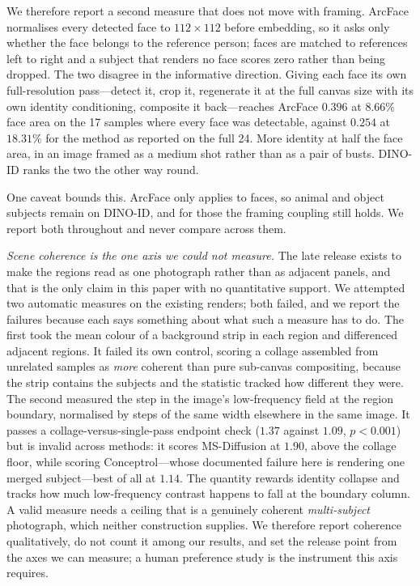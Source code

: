 \documentclass[10pt,twocolumn,letterpaper]{article}
\begin{document}
We therefore report a second measure that does not move with framing.
ArcFace normalises every detected face to $112\times112$ before embedding, so
it asks only whether the face belongs to the reference person; faces are
matched to references left to right and a subject that renders no face scores
zero rather than being dropped.  The two disagree in the informative
direction.  Giving each face its
own full-resolution pass---detect it, crop it, regenerate it at the full canvas
size with its own identity conditioning, composite it back---reaches ArcFace
$0.396$ at $8.66\%$ face area on the 17 samples where every face was
detectable, against $0.254$ at $18.31\%$ for the method as reported on the
full 24.  More identity at half the face area, in an image framed as a medium
shot rather than as a pair of busts.  DINO-ID ranks the two the other way
round.

One caveat bounds this.  ArcFace only applies to faces, so animal and object
subjects remain on DINO-ID, and for those the framing coupling still holds.
We report both throughout and never compare across them.

\noindent\textit{Scene coherence is the one axis we could not measure.}
The late release exists to make the regions read as one photograph rather
than as adjacent panels, and that is the only claim in this paper with no
quantitative support.  We attempted two automatic measures on the existing
renders; both failed, and we report the failures because each says something
about what such a measure has to do.  The first took the mean colour of a
background strip in each region and differenced adjacent regions.  It failed
its own control, scoring a collage assembled from unrelated samples as
\emph{more} coherent than pure sub-canvas compositing, because the strip
contains the subjects and the statistic tracked how different they were.  The
second measured the step in the image's low-frequency field at the region
boundary, normalised by steps of the same width elsewhere in the same image.
It passes a collage-versus-single-pass endpoint check ($1.37$ against $1.09$,
$p{<}0.001$) but is invalid across methods: it scores MS-Diffusion at $1.90$,
above the collage floor, while scoring Conceptrol---whose documented failure
here is rendering one merged subject---best of all at $1.14$.  The quantity
rewards identity collapse and tracks how much low-frequency contrast happens
to fall at the boundary column.  A valid measure needs a ceiling that is a
genuinely coherent \emph{multi-subject} photograph, which neither
construction supplies.  We therefore report coherence qualitatively, do not
count it among our results, and set the release point from the axes we can
measure; a human preference study is the instrument this axis requires.
\end{document}
